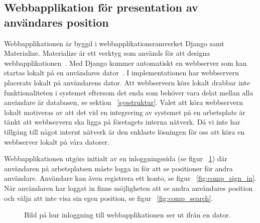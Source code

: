 \documentclass[a4paper,12pt]{article}
\begin{document}
 \subsection{Webbapplikation för presentation av användares position} \label{webbinterface}
 Webbapplikationen är byggd i webbapplikationsramverket Django samt Materialize. Materialize är ett verktyg som används för att designa webbapplikationen~\cite{materialize}. Med Django kommer automatiskt en webbserver som kan startas lokalt på en användares dator~\cite{djangoMVC}. I implementationen har webbservern placerats lokalt på användarens dator. Att webbservern körs lokalt drabbar inte funktionaliteten i systemet eftersom det enda som behöver vara delat mellan alla användare är databasen, se sektion ~\ref{sysstruktur}. Valet att köra webbservern lokalt motiveras av att det vid en integrering av systemet på en arbetsplats är tänkt att webbservern ska ligga på företagets interna nätverk. Då vi inte har tillgång till något internt nätverk är den enklaste lösningen för oss att köra en webbserver lokalt på våra datorer.

 Webbapplikationen utgörs initialt av en inloggningssida (se figur ~\ref{fig:comp_log_in}) där användaren på arbetsplatsen måste logga in för att se positioner för andra användare. Användare kan även registrera ett konto, se figur ~\ref{fig:comp_sign_in}. När användaren har loggat in finns möjligheten att se andra användares position och välja att inte visa sin egen position, se figur ~\ref{fig:comp_search}.

 \begin{figure}[H]
   \centering
   \caption{Bild på hur inloggning till webbapplikationen ser ut ifrån en dator.}
   \label{fig:comp_log_in}
 \end{figure}
\end{document}
